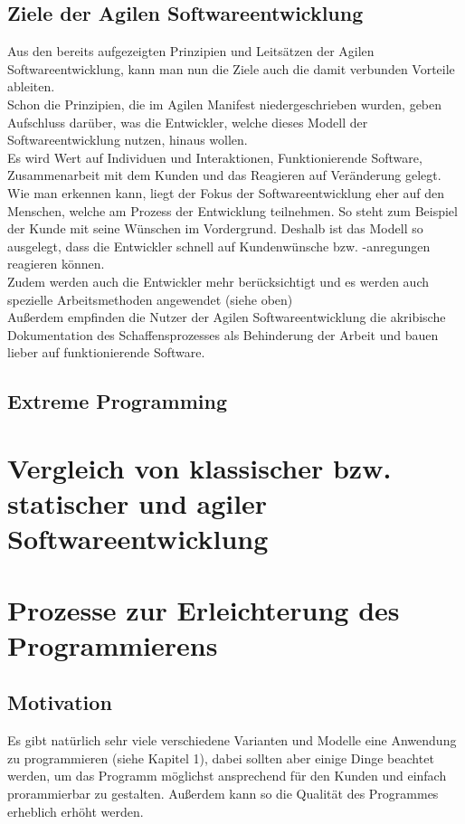\documentclass[a4paper, 10pt]{scrartcl}
\begin{document}
\subsection{Ziele der Agilen Softwareentwicklung}
Aus den bereits aufgezeigten Prinzipien und Leitsätzen der Agilen Softwareentwicklung, kann man nun die Ziele  auch die damit verbunden Vorteile ableiten. \\
Schon die Prinzipien, die im \glqq{}Agilen Manifest\grqq{} niedergeschrieben wurden, geben Aufschluss darüber, was die Entwickler, welche dieses Modell der Softwareentwicklung nutzen, hinaus wollen.\\ Es wird Wert auf \glqq{}Individuen und Interaktionen, Funktionierende Software, Zusammenarbeit mit dem Kunden und das Reagieren auf Veränderung\grqq{} gelegt. Wie man erkennen kann, liegt der Fokus der Softwareentwicklung eher auf den Menschen, welche am Prozess der Entwicklung teilnehmen. So steht zum Beispiel der Kunde mit seine Wünschen im Vordergrund. Deshalb ist das Modell so ausgelegt, dass die Entwickler schnell auf Kundenwünsche bzw. -anregungen reagieren können.\\ Zudem werden auch die Entwickler mehr berücksichtigt und es werden auch spezielle Arbeitsmethoden angewendet (siehe oben)\\Außerdem empfinden die Nutzer der Agilen Softwareentwicklung die akribische Dokumentation des Schaffensprozesses als Behinderung der Arbeit und bauen lieber auf \glqq funktionierende Software\grqq. \\ 

\subsection{Extreme Programming}

\section{Vergleich von klassischer bzw. statischer und agiler Softwareentwicklung}



\section{Prozesse zur Erleichterung des Programmierens}
\subsection{Motivation}
Es gibt natürlich sehr viele verschiedene Varianten und Modelle eine Anwendung zu programmieren (siehe Kapitel 1), dabei sollten aber einige Dinge beachtet werden, um das Programm möglichst ansprechend für den Kunden und einfach prorammierbar zu gestalten. Außerdem kann so die Qualität des Programmes erheblich erhöht werden. 
\end{document}
